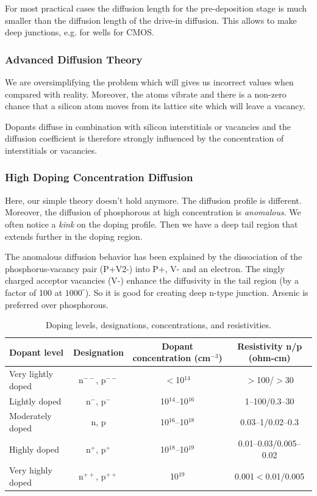 \documentclass{report}
\begin{document}
For most practical cases the diffusion length for the pre-deposition stage is much smaller than the diffusion length of the drive-in diffusion. This allows to make deep junctions, e.g. for wells for CMOS.

\subsubsection{Advanced Diffusion Theory}

We are oversimplifying the problem which will gives us incorrect values when compared with reality. Moreover, the atoms vibrate and there is a non-zero chance that a silicon atom moves from its lattice site which will leave a vacancy.

Dopants diffuse in combination with silicon interstitials or vacancies and the diffusion coefficient is therefore strongly influenced by the concentration of interstitials or vacancies.

\subsubsection{High Doping Concentration Diffusion}

Here, our simple theory doesn't hold anymore. The diffusion profile is different. Moreover, the diffusion of phosphorous at high concentration is \textit{anomalous}. We often notice a \textit{kink} on the doping profile. Then we have a deep tail region that extends further in the doping region.

The anomalous diffusion behavior has been explained by the dissociation of the phosphorus-vacancy pair (P+V2-) into P+, V- and an electron. The singly charged acceptor vacancies (V-) enhance the diffusivity in the tail region (by a factor of 100 at $1000^\circ$). So it is good for creating deep n-type junction. Arsenic is preferred over phosphorous.

\begin{table}[H]
    \centering
    \renewcommand{\arraystretch}{1.3}
    \begin{tabular}{|l|c|c|c|}
        \hline
        \textbf{Dopant level} & \textbf{Designation} & \textbf{Dopant concentration} (cm$^{-3}$) & \textbf{Resistivity n/p} (ohm-cm) \\
        \hline
        Very lightly doped & n$^{--}$, p$^{--}$ & $<$10$^{14}$ & $>$100/$>$30 \\
        Lightly doped & n$^{-}$, p$^{-}$ & 10$^{14}$–10$^{16}$ & 1–100/0.3–30 \\
        Moderately doped & n, p & 10$^{16}$–10$^{18}$ & 0.03–1/0.02–0.3 \\
        Highly doped & n$^{+}$, p$^{+}$ & 10$^{18}$–10$^{19}$ & 0.01–0.03/0.005–0.02 \\
        Very highly doped & n$^{++}$, p$^{++}$ & 10$^{19}$ & 0.001$<$0.01/0.005 \\
        \hline
    \end{tabular}
    \caption{Doping levels, designations, concentrations, and resistivities.}
    \label{tab:doping_levels}
\end{table}
\end{document}
